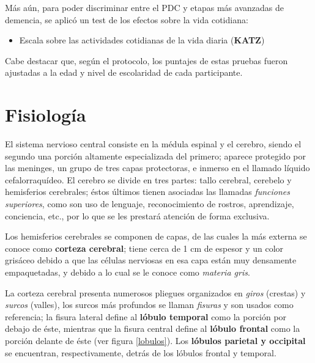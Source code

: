 Más aún, para poder discriminar entre el PDC y etapas más avanzadas de demencia, se aplicó un
test de los efectos sobre la vida cotidiana:
%
\begin{itemize}
\item {Escala sobre las actividades cotidianas de la vida diaria (\textbf{KATZ})} \cite{Roumec14}
\end{itemize}

Cabe destacar que, según el protocolo, los puntajes de estas pruebas fueron ajustadas a la edad y 
nivel de escolaridad de cada participante.


\section{Fisiología}

El sistema nervioso central consiste en la médula espinal y el cerebro, siendo el segundo una
porción altamente especializada del primero; aparece protegido por las meninges, un grupo de tres 
capas protectoras, e inmerso en el llamado líquido cefalorraquídeo.
El cerebro se divide en tres partes: tallo cerebral, cerebelo y hemisferios cerebrales; éstos 
últimos tienen asociadas las llamadas \textit{funciones superiores}, como son uso de lenguaje,
reconocimiento de rostros, aprendizaje, conciencia, etc., por lo que se les prestará atención de 
forma exclusiva.

Los hemisferios cerebrales se componen de capas, de las cuales la más externa se conoce como
\textbf{corteza cerebral}; tiene cerca de 1 cm de espesor y un color grisáceo debido a que las 
células nerviosas en esa capa están muy densamente empaquetadas, y debido a lo cual se le conoce
como \textit{materia gris}.

La corteza cerebral presenta numerosos pliegues organizados en \textit{giros} (crestas) y
\textit{surcos} (valles), los surcos más profundos se llaman \textit{fisuras} y son usados como 
referencia; la fisura lateral define al \textbf{lóbulo temporal} como la porción por debajo de 
éste, mientras que la fisura central define al \textbf{lóbulo frontal} como la porción delante de 
éste (ver figura \ref{lobulos}). Los \textbf{lóbulos parietal y occipital} se encuentran, 
respectivamente, detrás de los lóbulos frontal y temporal.

